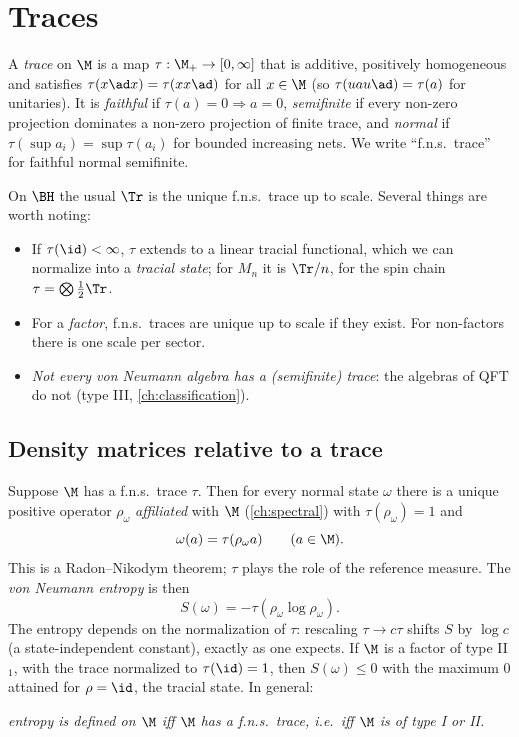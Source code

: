 \section{Traces}

\begin{definition}
A \emph{trace} on $\M$ is a map $\tau:\M_+\to[0,\infty]$ that is additive, positively homogeneous and satisfies $\tau(x\ad x)=\tau(xx\ad)$ for all $x\in\M$ (so $\tau(uau\ad)=\tau(a)$ for unitaries). It is \emph{faithful} if $\tau(a)=0\Rightarrow a=0$, \emph{semifinite} if every non-zero projection dominates a non-zero projection of finite trace, and \emph{normal} if $\tau(\sup a_i)=\sup\tau(a_i)$ for bounded increasing nets. We write ``f.n.s.\ trace'' for faithful normal semifinite.
\end{definition}

On $\BH$ the usual $\Tr$ is the unique f.n.s.\ trace up to scale. Several things are worth noting:
\begin{itemize}
\item If $\tau(\id)<\infty$, $\tau$ extends to a linear tracial functional, which we can normalize into a \emph{tracial state}; for $M_n$ it is $\Tr/n$, for the spin chain $\tau=\bigotimes\frac12\Tr$.
\item For a \emph{factor}, f.n.s.\ traces are unique up to scale if they exist. For non-factors there is one scale per sector.
\item \emph{Not every von Neumann algebra has a (semifinite) trace}: the algebras of QFT do not (type III, \cref{ch:classification}).
\end{itemize}

\subsection{Density matrices relative to a trace}
Suppose $\M$ has a f.n.s.\ trace $\tau$. Then for every normal state $\omega$ there is a unique positive operator $\rho_\omega$ \emph{affiliated} with $\M$ (\cref{ch:spectral}) with $\tau(\rho_\omega)=1$ and
\begin{equation}
\omega(a)=\tau(\rho_\omega a)\qquad(a\in\M).
\end{equation}
This is a Radon--Nikodym theorem; $\tau$ plays the role of the reference measure. The \emph{von Neumann entropy} is then
\begin{equation}
S(\omega)=-\tau(\rho_\omega\log\rho_\omega).
\end{equation}
The entropy depends on the normalization of $\tau$: rescaling $\tau\to c\tau$ shifts $S$ by $\log c$ (a state-independent constant), exactly as one expects. If $\M$ is a factor of type II$_1$, with the trace normalized to $\tau(\id)=1$, then $S(\omega)\le0$ with the maximum $0$ attained for $\rho=\id$, the tracial state. In general:
\begin{center}
\emph{entropy is defined on $\M$ iff $\M$ has a f.n.s.\ trace, i.e.\ iff $\M$ is of type I or II.}
\end{center}

